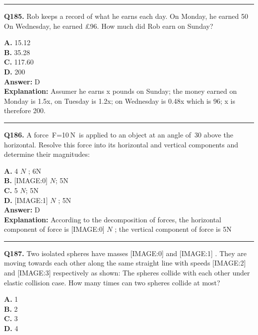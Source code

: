 \documentclass[12pt]{article}
\begin{document}
\hrule
\vspace{1em}


\noindent
\textbf{Q185.} Rob keeps a record of what he earns each day.
On Monday, he earned 50%
On Wednesday, he earned £96. How much did Rob earn on Sunday?



\textbf{A.} 15.12 \\
\textbf{B.} 35.28 \\
\textbf{C.} 117.60 \\
\textbf{D.} 200 \\

\textbf{Answer:} D \\
\textbf{Explanation:} Assumer he earns x pounds on Sunday; the money earned on Monday is 1.5x, on Tuesday is 1.2x; on Wednesday is 0.48x which is 96; x is therefore 200.

\hrule
\vspace{1em}


\noindent
\textbf{Q186.} A force F=10 N is applied to an object at an angle of 30
\circ 
above the horizontal. Resolve this force into its horizontal and vertical components and determine their magnitudes:



\textbf{A.} 4
$𝑁$
; 6N \\
\textbf{B.} [IMAGE:0]
$𝑁$; 5N \\
\textbf{C.} 5
$𝑁$; 5N \\
\textbf{D.} [IMAGE:1]
$𝑁$
; 5N \\

\textbf{Answer:} D \\
\textbf{Explanation:} According to the decomposition of forces, the horizontal component of force is
[IMAGE:0]
$𝑁$
; the vertical component of force is 5N

\hrule
\vspace{1em}


\noindent
\textbf{Q187.} Two isolated spheres have masses
[IMAGE:0]
and
[IMAGE:1]
. They are moving towards each other along the same straight line with speeds
[IMAGE:2]
and
[IMAGE:3]
respectively as shown:
The spheres collide with each other under elastic collision case. How many times can two spheres collide at most?



\textbf{A.} 1 \\
\textbf{B.} 2 \\
\textbf{C.} 3 \\
\textbf{D.} 4 \\
\end{document}
